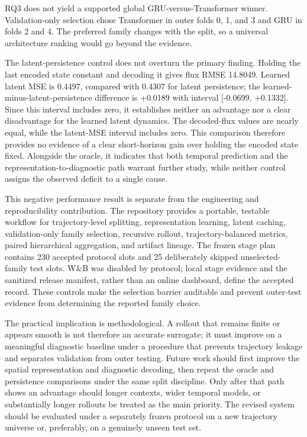 RQ3 does not yield a supported global GRU-versus-Transformer winner. Validation-only selection chose
Transformer in outer folds 0, 1, and 3 and GRU in folds 2 and 4. The preferred family changes with
the split, so a universal architecture ranking would go beyond the evidence.

The latent-persistence control does not overturn the primary finding. Holding the last encoded state
constant and decoding it gives flux RMSE 14.8049. Learned latent MSE is 0.4497, compared with
0.4307 for latent persistence; the learned-minus-latent-persistence difference is +0.0189 with
interval [-0.0699, +0.1332]. Since this interval includes zero, it establishes neither an advantage
nor a clear disadvantage for the learned latent dynamics. The decoded-flux values are nearly equal,
while the latent-MSE interval includes zero. This comparison therefore provides no evidence of a
clear short-horizon gain over holding the encoded state fixed. Alongside the oracle, it indicates
that both temporal prediction and the representation-to-diagnostic path warrant further study,
while neither control assigns the observed deficit to a single cause.

This negative performance result is separate from the engineering and reproducibility contribution.
The repository provides a portable, testable workflow for trajectory-level splitting,
representation learning, latent caching, validation-only family selection, recursive rollout,
trajectory-balanced metrics, paired hierarchical aggregation, and artifact lineage. The frozen
stage plan contains 230 accepted protocol slots and 25 deliberately skipped unselected-family test
slots. W\&B was disabled by protocol; local stage evidence and the sanitized release manifest,
rather than an online dashboard, define the accepted record. These controls make the selection
barrier auditable and prevent outer-test evidence from determining the reported family choice.

The practical implication is methodological. A rollout that remains finite or appears smooth is not
therefore an accurate surrogate; it must improve on a meaningful diagnostic baseline under a
procedure that prevents trajectory leakage and separates validation from outer testing. Future work
should first improve the spatial representation and diagnostic decoding, then repeat the oracle and
persistence comparisons under the same split discipline. Only after that path shows an advantage
should longer contexts, wider temporal models, or substantially longer rollouts be treated as the
main priority. The revised system should be evaluated under a separately frozen protocol on a new
trajectory universe or, preferably, on a genuinely unseen test set.

